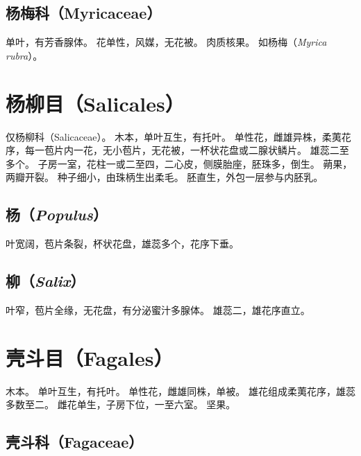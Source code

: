 \documentclass[11pt]{article}
\begin{document}
\begin{sloppypar}
\subsection{杨梅科（Myricaceae）}
单叶，有芳香腺体。
花单性，风媒，无花被。
肉质核果。
如杨梅（\textit{Myrica rubra}）。

\section{杨柳目（Salicales）}
仅杨柳科（Salicaceae）。
木本，单叶互生，有托叶。
单性花，雌雄异株，柔荑花序，每一苞片内一花，无小苞片，无花被，一杯状花盘或二腺状鳞片。
雄蕊二至多个。
子房一室，花柱一或二至四，二心皮，侧膜胎座，胚珠多，倒生。
蒴果，两瓣开裂。
种子细小，由珠柄生出柔毛。
胚直生，外包一层参与内胚乳。

\subsection{杨（\textit{Populus}）}
叶宽阔，苞片条裂，杯状花盘，雄蕊多个，花序下垂。

\subsection{柳（\textit{Salix}）}
叶窄，苞片全缘，无花盘，有分泌蜜汁多腺体。
雄蕊二，雄花序直立。

\section{壳斗目（Fagales）}
木本。
单叶互生，有托叶。
单性花，雌雄同株，单被。
雄花组成柔荑花序，雄蕊多数至二。
雌花单生，子房下位，一至六室。
坚果。

\subsection{壳斗科（Fagaceae）}


  
\end{sloppypar}
\end{document}
